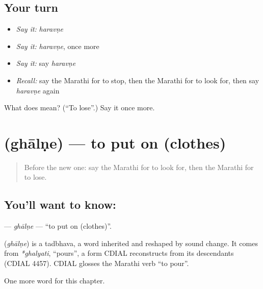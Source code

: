 \subsection*{Your turn}
\begin{itemize}
\raggedright
  \item \emph{Say it:} \emph{haravṇe}
  \item \emph{Say it:} \emph{haravṇe}, once more
  \item \emph{Say it:} say \emph{haravṇe}
  \item \emph{Recall:} say the Marathi for to stop, then the Marathi for to look for, then say \emph{haravṇe} again
\end{itemize}

\begin{tcolorbox}[breakable,colback=teal!4,colframe=teal!35!black,title={Before you move on}]
What does  mean? (\textquotedblleft{}To lose\textquotedblright{}.) Say it once more.
\end{tcolorbox}
\section[\texorpdfstring{\mr{घालणे} (ghālṇe)}{घालणे (ghālṇe)}]{ (ghālṇe) — to put on (clothes)}

\label{lesson:MR-C81-ghalne}



\begin{quote}
Before the new one: say the Marathi for to look for, then the Marathi for to lose.
\end{quote}

\subsection*{You'll want to know: }
\textbf{} — \emph{ghālṇe} — \textquotedblleft{}to put on (clothes)\textquotedblright{}.

\begin{cousinweb}
\textbf{} (\emph{ghālṇe}) is a tadbhava, a word inherited and reshaped by sound change. It comes from \emph{*ghalyati}, \textquotedblleft{}pours\textquotedblright{}, a form CDIAL reconstructs from its descendants (CDIAL 4457). CDIAL glosses the Marathi verb \textquotedblleft{}to pour\textquotedblright{}.
\end{cousinweb}

\begin{grammarlens}[title={What you've built}]
One more word for this chapter.
\end{grammarlens}

